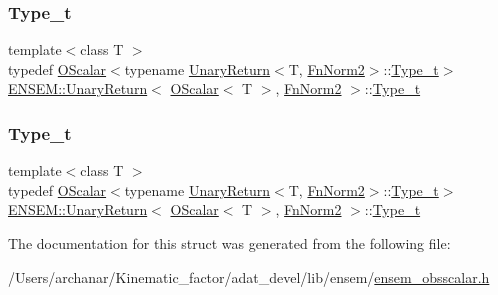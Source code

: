 \subsubsection{\texorpdfstring{Type\_t}{Type\_t}\hspace{0.1cm}{\footnotesize\ttfamily [1/2]}}
{\footnotesize\ttfamily template$<$class T $>$ \\
typedef \mbox{\hyperlink{classENSEM_1_1OScalar}{O\+Scalar}}$<$typename \mbox{\hyperlink{structENSEM_1_1UnaryReturn}{Unary\+Return}}$<$T, \mbox{\hyperlink{structENSEM_1_1FnNorm2}{Fn\+Norm2}}$>$\+::\mbox{\hyperlink{structENSEM_1_1UnaryReturn_3_01OScalar_3_01T_01_4_00_01FnNorm2_01_4_ac5e99e6905d2033009638fb21f07f1be}{Type\+\_\+t}}$>$ \mbox{\hyperlink{structENSEM_1_1UnaryReturn}{E\+N\+S\+E\+M\+::\+Unary\+Return}}$<$ \mbox{\hyperlink{classENSEM_1_1OScalar}{O\+Scalar}}$<$ T $>$, \mbox{\hyperlink{structENSEM_1_1FnNorm2}{Fn\+Norm2}} $>$\+::\mbox{\hyperlink{structENSEM_1_1UnaryReturn_3_01OScalar_3_01T_01_4_00_01FnNorm2_01_4_ac5e99e6905d2033009638fb21f07f1be}{Type\+\_\+t}}}

\mbox{\label{structENSEM_1_1UnaryReturn_3_01OScalar_3_01T_01_4_00_01FnNorm2_01_4_ac5e99e6905d2033009638fb21f07f1be}} 
\subsubsection{\texorpdfstring{Type\_t}{Type\_t}\hspace{0.1cm}{\footnotesize\ttfamily [2/2]}}
{\footnotesize\ttfamily template$<$class T $>$ \\
typedef \mbox{\hyperlink{classENSEM_1_1OScalar}{O\+Scalar}}$<$typename \mbox{\hyperlink{structENSEM_1_1UnaryReturn}{Unary\+Return}}$<$T, \mbox{\hyperlink{structENSEM_1_1FnNorm2}{Fn\+Norm2}}$>$\+::\mbox{\hyperlink{structENSEM_1_1UnaryReturn_3_01OScalar_3_01T_01_4_00_01FnNorm2_01_4_ac5e99e6905d2033009638fb21f07f1be}{Type\+\_\+t}}$>$ \mbox{\hyperlink{structENSEM_1_1UnaryReturn}{E\+N\+S\+E\+M\+::\+Unary\+Return}}$<$ \mbox{\hyperlink{classENSEM_1_1OScalar}{O\+Scalar}}$<$ T $>$, \mbox{\hyperlink{structENSEM_1_1FnNorm2}{Fn\+Norm2}} $>$\+::\mbox{\hyperlink{structENSEM_1_1UnaryReturn_3_01OScalar_3_01T_01_4_00_01FnNorm2_01_4_ac5e99e6905d2033009638fb21f07f1be}{Type\+\_\+t}}}



The documentation for this struct was generated from the following file\+:\begin{DoxyCompactItemize}
\item 
/\+Users/archanar/\+Kinematic\+\_\+factor/adat\+\_\+devel/lib/ensem/\mbox{\hyperlink{lib_2ensem_2ensem__obsscalar_8h}{ensem\+\_\+obsscalar.\+h}}\end{DoxyCompactItemize}
